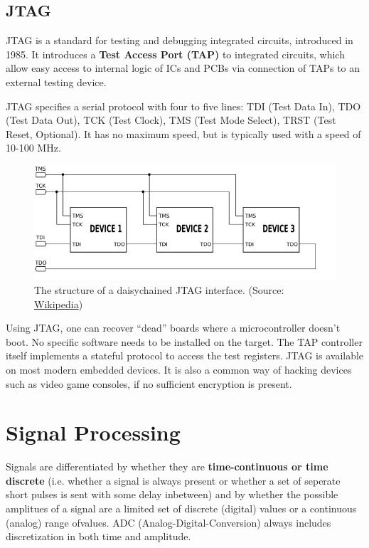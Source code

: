 \documentclass{report}
\newcommand{\tbf}{\textbf}
\newcommand*{\newpar}{\par\vspace{\baselineskip}\noindent} %
\begin{document}
\subsection{JTAG}
JTAG is a standard for testing and debugging integrated circuits, introduced in 1985. It introduces a \tbf{Test Access Port (TAP)} to integrated circuits, which allow easy access to internal logic of ICs and PCBs via connection of TAPs to an external testing device.
\newpar
JTAG specifies a serial protocol with four to five lines: TDI (Test Data In), TDO (Test Data Out), TCK (Test Clock), TMS (Test Mode Select), TRST (Test Reset, Optional). It has no maximum speed, but is typically used with a speed of 10-100 MHz.
\begin{figure}[h!]
\centering
\includegraphics[scale=0.5]{figures/JTAG.png}
\caption{The structure of a daisychained JTAG interface. (Source: \href{https://en.wikipedia.org/wiki/File:Jtag_chain.svg}{Wikipedia})}
\label{fig:DeltaPWM}
\end{figure}
Using JTAG, one can recover ``dead'' boards where a microcontroller doesn't boot. No specific software needs to be installed on the target. The TAP controller itself implements a stateful protocol to access the test registers. JTAG is available on most modern embedded devices. It is also a common way of hacking devices such as video game consoles, if no sufficient encryption is present.
%
\section{Signal Processing}
Signals are differentiated by whether they are \tbf{time-continuous or time discrete} (i.e. whether a signal is always present or whether a set of seperate short pulses is sent with some delay inbetween) and by whether the possible amplitues of a signal are a limited set of discrete (digital) values or a continuous (analog) range ofvalues. ADC (Analog-Digital-Conversion) always includes discretization in both time and amplitude.
\end{document}
